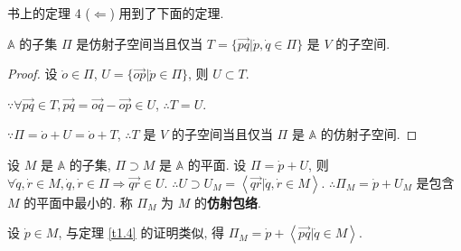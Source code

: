 \documentclass[color=black,device=normal,lang=cn,mode=geye]{elegantnote}
\begin{document}
书上的定理 4 ($\Leftarrow$) 用到了下面的定理.
\begin{theorem}\label{t1.4}
    $\mathbb{A}$ 的子集 $\varPi$ 是仿射子空间当且仅当 $T=\{\overrightarrow{pq}|\dot{p},\dot{q}\in\varPi\}$ 是 $V$ 的子空间.
\end{theorem}
\begin{proof}
    设 $\dot{o}\in\varPi$, $U=\{\overrightarrow{op}|\dot{p}\in\varPi\}$, 则 $U\subset T$.

    $\because\forall\overrightarrow{pq}\in T,\overrightarrow{pq}=\overrightarrow{oq}-\overrightarrow{op}\in U$, $\therefore T=U$.
    
    $\because\varPi=\dot{o}+U=\dot{o}+T$, $\therefore T$ 是 $V$ 的子空间当且仅当 $\varPi$ 是 $\mathbb{A}$ 的仿射子空间.
\end{proof}
设 $M$ 是 $\mathbb{A}$ 的子集, $\varPi\supset M$ 是 $\mathbb{A}$ 的平面. 设 $\varPi=\dot{p}+U$, 则 $\forall\dot{q},\dot{r}\in M,\dot{q},\dot{r}\in\varPi\Rightarrow\overrightarrow{qr}\in U$. $\therefore U\supset U_M=\left<\overrightarrow{qr}|\dot{q},\dot{r}\in M\right>$. $\therefore\varPi_M=\dot{p}+U_M$ 是包含 $M$ 的平面中最小的. 称 $\varPi_M$ 为 $M$ 的\textbf{仿射包络}.

设 $\dot{p}\in M$, 与定理 \ref{t1.4} 的证明类似, 得 $\varPi_M=\dot{p}+\left<\overrightarrow{pq}|\dot{q}\in M\right>$.
\end{document}
